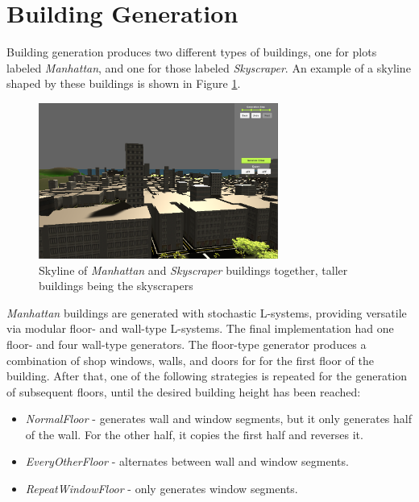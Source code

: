 \section{Building Generation}


Building generation produces two different types of buildings, one for plots labeled \textit{Manhattan}, and one for those labeled \textit{Skyscraper}. 
An example of a skyline shaped by these buildings is shown in Figure \ref{fig:skyline-result}.

\begin{figure}[H]
  \centering

  \includegraphics[width=0.7\textwidth]{figure/skyline.PNG}
  \caption{Skyline of \textit{Manhattan} and \textit{Skyscraper} buildings together, taller buildings being the skyscrapers}

  \label{fig:skyline-result}
\end{figure}

\textit{Manhattan} buildings are generated with stochastic L-systems, providing versatile via modular floor- and wall-type L-systems.
The final implementation had one floor- and four wall-type generators.
The floor-type generator produces a combination of shop windows, walls, and doors for for the first floor of the building.
After that, one of the following strategies is repeated for the generation of subsequent floors, until the desired building height has been reached:

\begin{itemize}
  \item \textit{NormalFloor} - generates wall and window segments, but it only generates half of the wall. For the other half, it copies the first half and reverses it. 
  \item \textit{EveryOtherFloor} - alternates between wall and window segments.
  \item \textit{RepeatWindowFloor} - only generates window segments.
\end{itemize}


